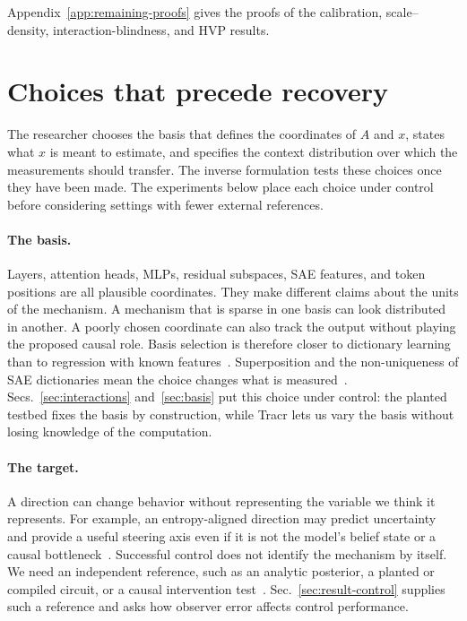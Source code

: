 \documentclass[sigconf,10pt,nonacm,balance=false]{acmart}
\begin{document}
Appendix~\ref{app:remaining-proofs} gives the proofs of the calibration, scale--density, interaction-blindness, and HVP results.

\section{Choices that precede recovery}\label{sec:limits}

The researcher chooses the basis that defines the coordinates of $A$ and $x$, states what $x$ is meant to estimate, and specifies the context distribution over which the measurements should transfer. The inverse formulation tests these choices once they have been made. The experiments below place each choice under control before considering settings with fewer external references.

\paragraph{The basis.}
Layers, attention heads, MLPs, residual subspaces, SAE features, and token positions are all plausible coordinates. They make different claims about the units of the mechanism. A mechanism that is sparse in one basis can look distributed in another. A poorly chosen coordinate can also track the output without playing the proposed causal role. Basis selection is therefore closer to dictionary learning than to regression with known features~\cite{arora2014dictionary}. Superposition and the non-uniqueness of SAE dictionaries mean the choice changes what is measured~\cite{elhage2022superposition,leask2025canonical}. Secs.~\ref{sec:interactions} and~\ref{sec:basis} put this choice under control: the planted testbed fixes the basis by construction, while Tracr lets us vary the basis without losing knowledge of the computation.

\paragraph{The target.}
A direction can change behavior without representing the variable we think it represents. For example, an entropy-aligned direction may predict uncertainty and provide a useful steering axis even if it is not the model's belief state or a causal bottleneck~\cite{agarwal2025scaling}. Successful control does not identify the mechanism by itself. We need an independent reference, such as an analytic posterior, a planted or compiled circuit, or a causal intervention test~\cite{agarwal2025geometry,geiger2024das,geiger2025causal}. Sec.~\ref{sec:result-control} supplies such a reference and asks how observer error affects control performance.
\end{document}
